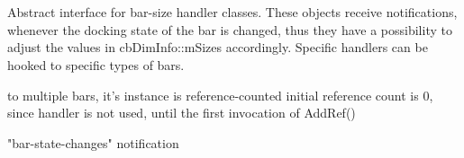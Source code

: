 %
%


\section{}\label{cbbardimhandlerbase}


Abstract interface for bar-size handler classes.
   These objects receive notifications, whenever the docking
   state of the bar is changed, thus they have a possibility
   to adjust the values in cbDimInfo::mSizes accordingly.
   Specific handlers can be hooked to specific types of bars.
 





\label{cbbardimhandlerbasecbbardimhandlerbase}


to multiple bars, it's instance is
reference-counted
initial reference count is 0, since handler is not used, until the
first invocation of AddRef()


\label{cbbardimhandlerbaseaddref}



\label{cbbardimhandlerbaseonchangebarstate}


"bar-state-changes" notification


\label{cbbardimhandlerbaseonresizebar}



\label{cbbardimhandlerbaseremoveref}


